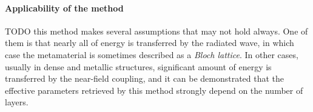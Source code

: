 \paragraph{Applicability of the method}
TODO this method makes several assumptions that may not hold always. One of them is that nearly all of energy is transferred by the radiated wave, in which case the metamaterial is sometimes described as a \textit{Bloch lattice}. \cite{simovski2007bloch, andryieuski2010homogenization} In other cases, usually in dense and metallic structures, significant amount of energy is transferred by the near-field coupling, and it can be demonstrated that the effective parameters retrieved by this method strongly depend on the number of layers. \cite{rockstuhl2008transition}


